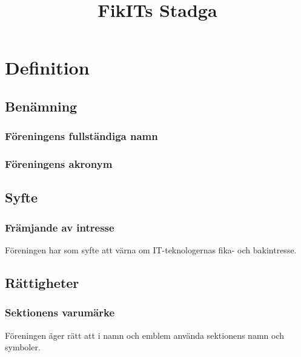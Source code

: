 \documentclass[11pt, noincludeaddress]{classes/cthit}
\begin{document}
\title{FikITs Stadga}
\maketitle

\thispagestyle{empty}

\newpage

\makeheadfoot%

\setcounter{tocdepth}{2}
\setcounter{page}{1}
\tableofcontents

\newpage

\section{Definition}




\subsection{Benämning}

\subsubsection{Föreningens fullständiga namn}
\FIKITFULL{}

\subsubsection{Föreningens akronym}
\FIKIT{}




\subsection{Syfte}

\subsubsection{Främjande av intresse}
Föreningen har som syfte att värna om IT-teknologernas fika- och bakintresse.

\subsection{Rättigheter}
\subsubsection{Sektionens varumärke}
Föreningen äger rätt att i namn och emblem använda sektionens namn och symboler. 
\end{document}
